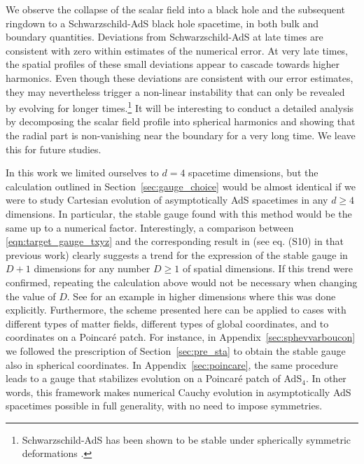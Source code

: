 \documentclass[a4paper,11pt]{article}
\numberwithin{equation}{section}
\begin{document}
We observe the collapse of the scalar field into a black hole and the subsequent ringdown to a Schwarzschild-AdS  black hole spacetime, in both bulk and boundary quantities.
Deviations from Schwarzschild-AdS at late times are consistent with zero within estimates of the numerical error. 
At very late times, the spatial profiles of these small deviations appear to cascade towards higher harmonics.
Even though these deviations are consistent with our error estimates, they may nevertheless trigger a non-linear instability that can only be revealed by evolving for longer times.\footnote{Schwarzschild-AdS has been shown to be stable under spherically symmetric deformations \cite{Holzegel:2011uu}.} 
It will be interesting to conduct a detailed analysis by decomposing the scalar field profile into spherical harmonics and showing that the radial part is non-vanishing near the boundary for a very long time.
We leave this for future studies.

In this work we limited ourselves to $d=4$ spacetime dimensions, but the calculation outlined in Section~\ref{sec:gauge_choice} would be almost identical if we were to study Cartesian evolution of asymptotically AdS spacetimes in any $d\geq4$ dimensions. In particular, the stable gauge found with this method would be the same up to a numerical factor. 
Interestingly, a comparison between \eqref{eqn:target_gauge_txyz} and the corresponding result in \cite{Bantilan:2017kok} (see eq. (S10) in that previous work) clearly suggests a trend for the expression of the stable gauge in $D+1$ dimensions for any number $D\geq1$ of spatial dimensions. 
If this trend were confirmed, repeating the calculation above would not be necessary when changing the value of $D$. 
See \cite{Bantilan:2020pay} for an example in higher dimensions where this was done explicitly.
Furthermore, the scheme presented here can be applied to cases with different types of matter fields, different types of global coordinates, and to coordinates on a Poincar\'{e} patch.
For instance, in Appendix~\ref{sec:sphevvarboucon} we followed the prescription of Section~\ref{sec:pre_sta} to obtain the stable gauge also in spherical coordinates.
In Appendix~\ref{sec:poincare}, the same procedure leads to a gauge that stabilizes evolution on a Poincar\'e patch of AdS$_4$.
In other words, this framework makes numerical Cauchy evolution in asymptotically AdS spacetimes possible in full generality, with no need to impose symmetries.
\end{document}
